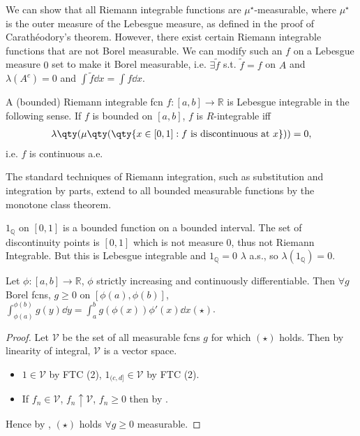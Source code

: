 \begin{remark}
	We can show that all Riemann integrable functions are $\mu^\star$-measurable, where $\mu^\star$ is the outer measure of the Lebesgue measure, as defined in the proof of Carath\'eodory's theorem.
	However, there exist certain Riemann integrable functions that are not Borel measurable.
	We can modify such an $f$ on a Lebesgue measure $0$ set to make it Borel measurable, i.e. $\exists \widetilde f$ s.t. $\widetilde{f} = f$ on $A$ and $\lambda(A^c) = 0$ and $\int \widetilde{f} \dd{x} = \int f \dd{x}$.

	A (bounded) Riemann integrable fcn $f : [a, b] \to \mathbb{R}$ is Lebesgue integrable in the following sense.
	If $f$ is bounded on $[a, b]$, $f$ is $R$-integrable iff
	\begin{align*}
		\lambda\qty(\mu\qty(\qty{x \in [0,1] : f \text{ is discontinuous at } x})) = 0,
	\end{align*} i.e. $f$ is continuous a.e.

	The standard techniques of Riemann integration, such as substitution and integration by parts, extend to all bounded measurable functions by the monotone class theorem.
\end{remark}

\begin{example}
	$1_\mathbb{Q}$ on $[0, 1]$ is a bounded function on a bounded interval.
	The set of discontinuity points is $[0, 1]$ which is not measure $0$, thus not Riemann Integrable.
	But this is Lebesgue integrable and $1_\mathbb{Q} = 0$ $\lambda$ a.s., so $\lambda(1_\mathbb{Q}) = 0$.
\end{example}

\begin{theorem}
	Let $\phi : [a, b] \to \mathbb{R}$, $\phi$ strictly increasing and continuously differentiable.
	Then $\forall g$ Borel fcns, $g \geq 0$ on $[\phi(a), \phi(b)]$, $\int_{\phi(a)}^{\phi(b)} g(y) \dd{y} = \int_a^b g(\phi(x)) \phi'(x) \dd{x} (\star)$.
\end{theorem}

\begin{proof}
	Let $\mathcal{V}$ be the set of all measurable fcns $g$ for which $(\star)$ holds.
	Then by linearity of integral, $\mathcal{V}$ is a vector space.
	\begin{itemize}
		\item $1 \in \mathcal{V}$ by FTC (2), $1_{(c, d]} \in \mathcal{V}$ by FTC (2).
		\item If $f_n \in \mathcal{V}$, $f_n \uparrow \mathcal{V}$, $f_n \geq 0$ then by .
	\end{itemize}
	Hence by , $(\star)$ holds $\forall g \geq 0$ measurable.
\end{proof}

